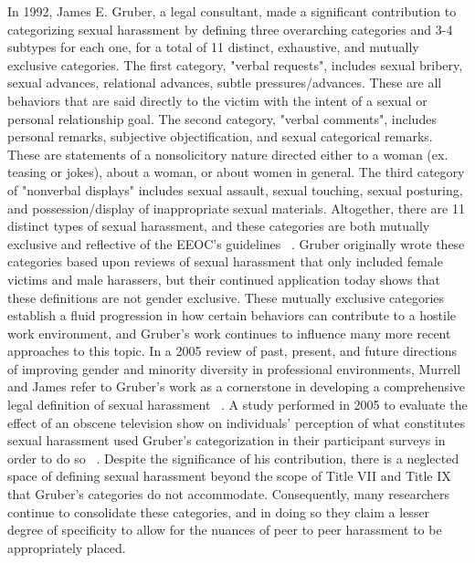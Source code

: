In 1992, James E. Gruber, a legal consultant, made a significant contribution to categorizing sexual harassment by defining three overarching categories and 3-4 subtypes for each one, for a total of 11 distinct, exhaustive, and mutually exclusive categories. The first category, "verbal requests", includes sexual bribery, sexual advances, relational advances, subtle pressures/advances. These are all behaviors that are said directly to the victim with the intent of a sexual or personal relationship goal. The second category, "verbal comments", includes personal remarks, subjective objectification, and sexual categorical remarks. These are statements of a nonsolicitory nature directed either to a woman (ex. teasing or jokes), about a woman, or about women in general. The third category of "nonverbal displays" includes sexual assault, sexual touching, sexual posturing, and possession/display of inappropriate sexual materials. Altogether, there are 11 distinct types of sexual harassment, and these categories are both mutually exclusive and reflective of the EEOC's guidelines ~\cite{gruber1992topology}. Gruber originally wrote these categories based upon reviews of sexual harassment that only included female victims and male harassers, but their continued application today shows that these definitions are not gender exclusive. These mutually exclusive categories establish a fluid progression in how certain behaviors can contribute to a hostile work environment, and Gruber's work continues to influence many more recent approaches to this topic. In a 2005 review of past, present, and future directions of improving gender and minority diversity in professional environments, Murrell and James refer to Gruber's work as a cornerstone in developing a comprehensive legal definition of sexual harassment ~\cite{murrell2002pastpresentfuture}. A study performed in 2005 to evaluate the effect of an obscene television show on individuals' perception of what constitutes sexual harassment used Gruber's categorization in their participant surveys in order to do so ~\cite{berlin2005gruberverification}. Despite the significance of his contribution, there is a neglected space of defining sexual harassment beyond the scope of Title VII and Title IX that Gruber's categories do not accommodate. Consequently, many researchers continue to consolidate these categories, and in doing so they claim a lesser degree of specificity to allow for the nuances of peer to peer harassment to be appropriately placed.

